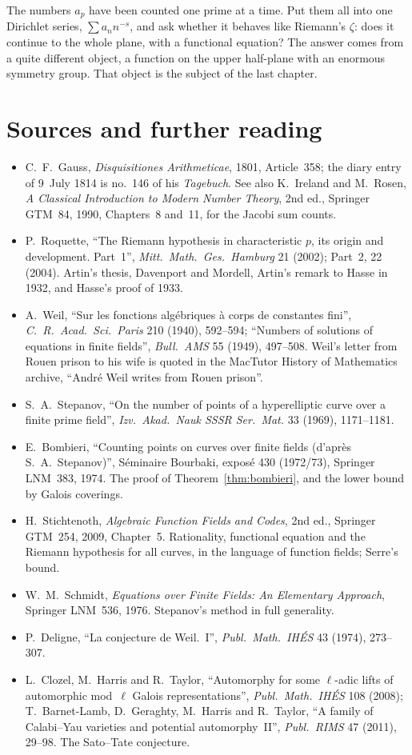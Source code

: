 The numbers $a_p$ have been counted one prime at a time. Put them all into one Dirichlet series, $\sum a_nn^{-s}$, and ask whether it behaves like
Riemann's $\zeta$: does it continue to the whole plane, with a functional equation? The answer comes from a quite different object, a function on
the upper half-plane with an enormous symmetry group. That object is the subject of the last chapter.

\section*{Sources and further reading}

\begin{itemize}
\item C.~F.~Gauss, \emph{Disquisitiones Arithmeticae}, 1801, Article~358; the diary entry of 9~July 1814 is no.~146 of his \emph{Tagebuch}. See also K.~Ireland and
M.~Rosen, \emph{A Classical Introduction to Modern Number Theory}, 2nd ed., Springer GTM~84, 1990, Chapters~8 and~11, for the Jacobi sum counts.
\item P.~Roquette, ``The Riemann hypothesis in characteristic $p$, its origin and development. Part~1'', \emph{Mitt.\ Math.\ Ges.\ Hamburg} 21 (2002); Part~2, 22 (2004).
Artin's thesis, Davenport and Mordell, Artin's remark to Hasse in 1932, and Hasse's proof of 1933.
\item A.~Weil, ``Sur les fonctions alg\'ebriques \`a corps de constantes fini'', \emph{C.\ R.\ Acad.\ Sci.\ Paris} 210 (1940), 592--594; ``Numbers of solutions of
equations in finite fields'', \emph{Bull.\ AMS} 55 (1949), 497--508. Weil's letter from Rouen prison to his wife is quoted in the MacTutor History of Mathematics
archive, ``Andr\'e Weil writes from Rouen prison''.
\item S.~A.~Stepanov, ``On the number of points of a hyperelliptic curve over a finite prime field'', \emph{Izv.\ Akad.\ Nauk SSSR Ser.\ Mat.} 33 (1969), 1171--1181.
\item E.~Bombieri, ``Counting points on curves over finite fields (d'apr\`es S.~A.~Stepanov)'', S\'eminaire Bourbaki, expos\'e 430 (1972/73), Springer LNM~383, 1974.
The proof of Theorem~\ref{thm:bombieri}, and the lower bound by Galois coverings.
\item H.~Stichtenoth, \emph{Algebraic Function Fields and Codes}, 2nd ed., Springer GTM~254, 2009, Chapter~5. Rationality, functional equation and the Riemann
hypothesis for all curves, in the language of function fields; Serre's bound.
\item W.~M.~Schmidt, \emph{Equations over Finite Fields: An Elementary Approach}, Springer LNM~536, 1976. Stepanov's method in full generality.
\item P.~Deligne, ``La conjecture de Weil.~I'', \emph{Publ.\ Math.\ IH\'ES} 43 (1974), 273--307.
\item L.~Clozel, M.~Harris and R.~Taylor, ``Automorphy for some $\ell$-adic lifts of automorphic mod~$\ell$ Galois representations'', \emph{Publ.\ Math.\ IH\'ES} 108 (2008);
T.~Barnet-Lamb, D.~Geraghty, M.~Harris and R.~Taylor, ``A family of Calabi--Yau varieties and potential automorphy~II'', \emph{Publ.\ RIMS} 47 (2011), 29--98.
The Sato--Tate conjecture.
\end{itemize}
